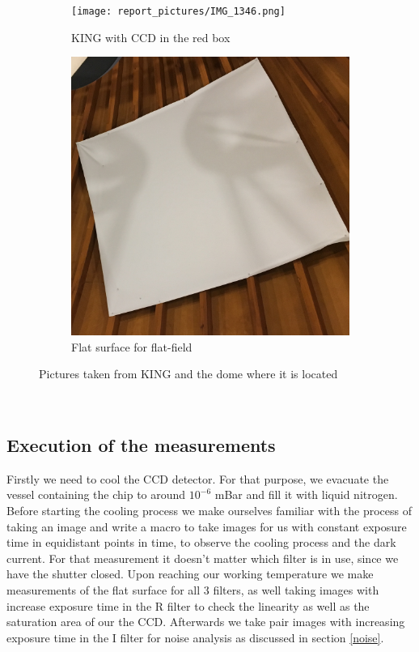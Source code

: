 \begin{figure}[h]
	\begin{subfigure}{0.5\textwidth}
	\centering
	\texttt{[image: report\_pictures/IMG\_1346.png]}
	\caption{KING with CCD in the red box}
	\label{tele}
	\end{subfigure}
	\begin{subfigure}{0.5\textwidth}
	\centering
	\includegraphics[width=0.8\linewidth]{report_pictures/IMG_1351.png}
	\caption{Flat surface for flat-field}
	\label{flat_white}
	\end{subfigure}
	\caption{Pictures taken from KING and the dome where it is located}
\end{figure}
\vspace{3mm}\\
\subsection{Execution of the measurements}
Firstly we need to cool the CCD detector. For that purpose, we evacuate the vessel containing the chip to around $10^{-6}$ mBar and fill it with liquid nitrogen. Before starting the cooling process we make ourselves familiar with the process of taking an image and write a macro to take images for us with constant exposure time in equidistant points in time, to observe the cooling process and the dark current. For that measurement it doesn't matter which filter is in use, since we have the shutter closed. Upon reaching our working temperature we make measurements of the flat surface for all 3 filters, as well taking images with increase exposure time in the R filter to check the linearity as well as the saturation area of our the CCD. Afterwards we take pair images with increasing exposure time in the I filter for noise analysis as discussed in section \ref{noise}. 
\vspace{3mm}\\
